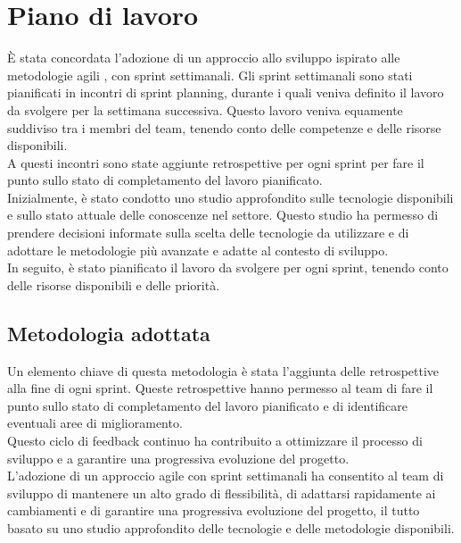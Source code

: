 

\section{Piano di lavoro}
È stata concordata l'adozione di un approccio allo sviluppo ispirato alle
metodologie agili \cite{agile}, con sprint settimanali. Gli sprint settimanali sono stati pianificati in
incontri di sprint planning, durante i quali veniva definito il lavoro da svolgere per la
settimana successiva. Questo lavoro veniva equamente suddiviso tra i membri del team, tenendo
conto delle competenze e delle risorse disponibili.\\


A questi incontri sono state aggiunte retrospettive
per ogni sprint per fare il punto sullo stato di completamento del lavoro pianificato.\\

Inizialmente, è stato condotto uno studio approfondito sulle tecnologie disponibili e sullo
stato attuale delle conoscenze nel settore. Questo studio ha permesso di prendere decisioni
informate sulla scelta delle tecnologie da utilizzare e di adottare le metodologie più avanzate
e adatte al contesto di sviluppo.\\

In seguito, è stato pianificato il lavoro da svolgere per ogni sprint, tenendo conto
delle risorse disponibili e delle priorità.\\


\subsection{Metodologia adottata}
Un elemento chiave di questa metodologia è stata l'aggiunta delle retrospettive alla fine di ogni sprint.
Queste retrospettive hanno permesso al team di fare il punto sullo stato di completamento del lavoro
pianificato e di identificare eventuali aree di miglioramento.\\

Questo ciclo di feedback continuo ha contribuito a ottimizzare il processo di sviluppo e a
garantire una progressiva evoluzione del progetto.\\

L'adozione di un approccio agile con sprint settimanali ha consentito al team di sviluppo
di mantenere un alto grado di flessibilità, di adattarsi rapidamente ai cambiamenti e di
garantire una progressiva evoluzione del progetto, il tutto basato su uno studio approfondito
delle tecnologie e delle metodologie disponibili.

